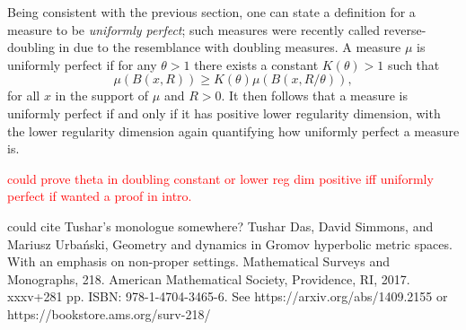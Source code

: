 Being consistent with the previous section, one can state a definition for a measure to be \textit{uniformly perfect}; such measures were recently called reverse-doubling in \cite{} due to the resemblance with doubling measures. A measure $\mu$ is uniformly perfect if for any $\theta > 1$ there exists a constant $K(\theta) > 1$ such that 
\[
\mu(B(x,R)) \ge K(\theta) \mu(B(x,R/\theta)),
\]
for all $x$ in the support of $\mu$ and $R > 0$. It then follows that a measure is uniformly perfect if and only if it has positive lower regularity dimension, with the lower regularity dimension again quantifying how uniformly perfect a measure is.


\textcolor{red}{could prove theta in doubling constant or lower reg dim positive iff uniformly perfect if wanted a proof in intro.}




could cite Tushar's monologue somewhere? Tushar Das, David Simmons, and Mariusz Urbański, Geometry and dynamics in Gromov hyperbolic metric spaces. With an emphasis on non-proper settings. Mathematical Surveys and Monographs, 218. American Mathematical Society, Providence, RI, 2017. xxxv+281 pp. ISBN: 978-1-4704-3465-6. See https://arxiv.org/abs/1409.2155 or https://bookstore.ams.org/surv-218/